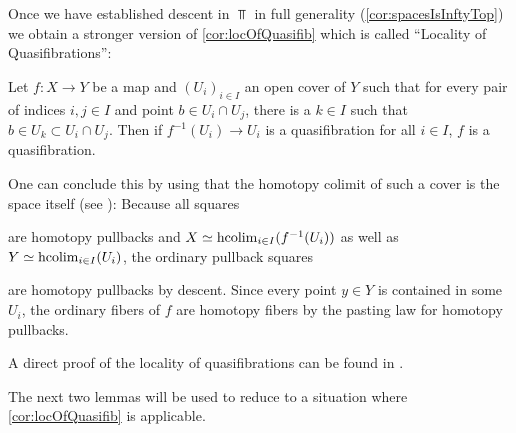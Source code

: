 \begin{remark}\label{rmk:locOfQuasifibDescent}
    Once we have established descent in $\Top$ in full generality (\cref{cor:spacesIsInftyTop}) we obtain a stronger version of \cref{cor:locOfQuasifib} which is called ``Locality of Quasifibrations'':
    
    Let $f\colon X\to Y$ be a map and $(U_i)_{i\in I}$ an open cover of $Y$ such that for every pair of indices $i,j\in I$ and point $b\in U_i\cap U_j$, there is a $k\in I$ such that $b\in U_k\subset U_i\cap U_j$.
    Then if $f^{-1}(U_i)\to U_i$ is a quasifibration for all $i\in I$, $f$ is a quasifibration.

    One can conclude this by using that the homotopy colimit of such a cover is the space itself (see \cite[Proposition 4.6 (c)]{hypercovers}):
    Because all squares
    \begin{center}
    \end{center}
    are homotopy pullbacks and $X\simeq\operatorname{hcolim}\limits_{i\in I}(f^{-1}(U_i))$ as well as $Y\simeq\operatorname{hcolim}\limits_{i\in I}(U_i)$, the ordinary pullback squares 
    \begin{center}
    \end{center}
    are homotopy pullbacks by descent.
    Since every point $y\in Y$ is contained in some $U_i$, the ordinary fibers of $f$ are homotopy fibers by the pasting law for homotopy pullbacks. 

    A direct proof of the locality of quasifibrations can be found in \cite[Theorem A.1.2]{aguilar2002algebraic}.
\end{remark}
The next two lemmas will be used to reduce to a situation where \cref{cor:locOfQuasifib} is applicable.
